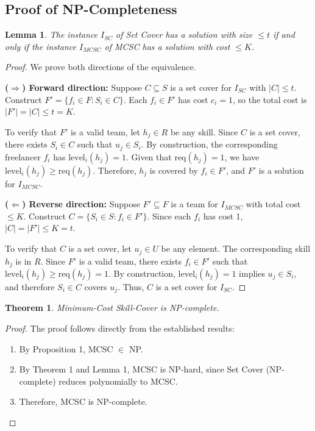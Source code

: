 \documentclass[12pt,a4paper]{article}
\newtheorem{theorem}{Theorem}[section]
\newtheorem{lemma}{Lemma}[section]
\newtheorem{proof}{Proof}
\begin{document}
\subsection{Proof of NP-Completeness}
\label{subsec:np-completeness-proof}

\begin{lemma}
	The instance $I_{SC}$ of Set Cover has a solution with size $\leq t$ if and only if the instance $I_{MCSC}$ of MCSC has a solution with cost $\leq K$.
\end{lemma}

\begin{proof}
	We prove both directions of the equivalence.
	
	\textbf{($\Rightarrow$) Forward direction:} Suppose $C \subseteq S$ is a set cover for $I_{SC}$ with $|C| \leq t$. Construct $F' = \{f_i \in F : S_i \in C\}$. Each $f_i \in F'$ has cost $c_i = 1$, so the total cost is $|F'| = |C| \leq t = K$.
	
	To verify that $F'$ is a valid team, let $h_j \in R$ be any skill. Since $C$ is a set cover, there exists $S_i \in C$ such that $u_j \in S_i$. By construction, the corresponding freelancer $f_i$ has $\text{level}_i(h_j) = 1$. Given that $\text{req}(h_j) = 1$, we have $\text{level}_i(h_j) \geq \text{req}(h_j)$. Therefore, $h_j$ is covered by $f_i \in F'$, and $F'$ is a solution for $I_{MCSC}$.
	
	\textbf{($\Leftarrow$) Reverse direction:} Suppose $F' \subseteq F$ is a team for $I_{MCSC}$ with total cost $\leq K$. Construct $C = \{S_i \in S : f_i \in F'\}$. Since each $f_i$ has cost 1, $|C| = |F'| \leq K = t$.
	
	To verify that $C$ is a set cover, let $u_j \in U$ be any element. The corresponding skill $h_j$ is in $R$. Since $F'$ is a valid team, there exists $f_i \in F'$ such that $\text{level}_i(h_j) \geq \text{req}(h_j) = 1$. By construction, $\text{level}_i(h_j) = 1$ implies $u_j \in S_i$, and therefore $S_i \in C$ covers $u_j$. Thus, $C$ is a set cover for $I_{SC}$.
\end{proof}

\begin{theorem}
	Minimum-Cost Skill-Cover is NP-complete.
\end{theorem}

\begin{proof}
	The proof follows directly from the established results:
	
	\begin{enumerate}
		\item By Proposition 1, MCSC $\in$ NP.
		\item By Theorem 1 and Lemma 1, MCSC is NP-hard, since Set Cover (NP-complete) reduces polynomially to MCSC.
		\item Therefore, MCSC is NP-complete.
	\end{enumerate}
\end{proof}
\end{document}
